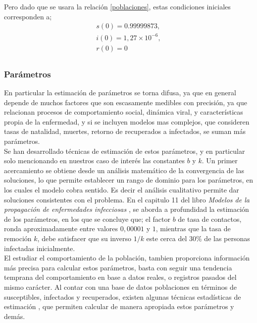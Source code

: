 \documentclass[journal]{IEEEtran}
\begin{document}
Pero dado que se usara la relación \ref{poblaciones}, estas condiciones iniciales corresponden a;
\begin{equation}
	\begin{split}
		s(0) = 0. 99999873,\\
		i(0) = 1, 27 \times 10^{-6},\\
		r(0) = 0\\
	\end{split}
\end{equation}

\subsubsection{Parámetros}
En particular la estimación de parámetros se torna difusa,
ya que en general depende de muchos factores que son escasamente medibles
con precisión, ya que relacionan procesos de comportamiento social, dinámica viral,
y características propia de la enfermedad, y si se incluyen modelos mas complejos,
que consideren tasas de natalidad, muertes, retorno de recuperados a infectados,
se suman más parámetros.\\

Se han desarrollado técnicas de estimación de estos parámetros, y en particular solo mencionando
en nuestros caso de interés las constantes $b$ y $k$. Un primer acercamiento se obtiene
desde un análisis matemático de la convergencia de las soluciones, lo que permite establecer
un rango de dominio para los parámetros, en los cuales el modelo cobra sentido. Es decir
el análisis cualitativo permite dar soluciones consistentes con el problema. En el capitulo 11
del libro \textit{Modelos de la propagación de enfermedades infecciosas} \cite{Modelos de propagacion
}, se aborda a profundidad la estimación de los parámetros, en los que se concluye que;
el factor $b$ de tasa de contactos, ronda aproximadamente entre valores $0,00001$ y $1$, mientras que la tasa de remoción
$k$, debe satisfacer que su inverso $1/k$ este cerca del $30\%$ de las personas infectadas inicialmente.\\

El estudiar el comportamiento de la población, tambien proporciona información más precisa para
calcular estos parámetros, basta con seguir una tendencia temprana del comportamiento en base a datos
reales, o registros pasados del mismo carácter. Al contar con una base de datos poblaciones en términos de susceptibles, infectados
y recuperados, existen algunas técnicas estadísticas de estimación \cite{Modelos de propagacion}, que permiten calcular de manera apropiada
estos parámetros y demás.\\
\end{document}
